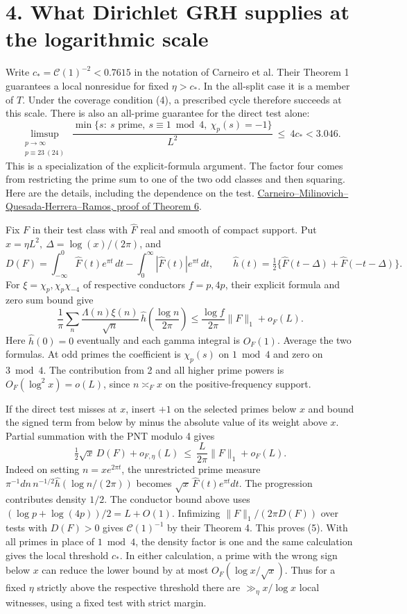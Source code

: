 \documentclass[11pt]{article}
\newcommand{\ch}{\chi_p}
\newcommand{\cmqr}{\href{https://arxiv.org/pdf/2404.08380}{Carneiro--Milinovich--Quesada-Herrera--Ramos, proof of Theorem 6}}
\begin{document}
\newpage
\section*{4. What Dirichlet GRH supplies at the logarithmic scale}
Write \(c_*=\mathcal C(1)^{-2}<0.7615\) in the notation of Carneiro et
al. Their Theorem 1 guarantees a local nonresidue for fixed \(\eta>c_*\).
In the all-split case it is a member of \(T\). Under the coverage
condition (4), a prescribed cycle therefore succeeds at this scale.
There is also an all-prime guarantee for the direct test alone:
\begin{equation}
 \limsup_{\substack{p\to\infty\\p\equiv23\ (24)}}\
 \frac{\min\{s:\ s\text{ prime},\ s\equiv1\bmod4,\ \ch(s)=-1\}}{L^2}
 \ \le\ 4c_* <3.046.
\end{equation}
This is a specialization of the explicit-formula argument. The factor four
comes from restricting the prime sum to one of the two odd classes and then
squaring. Here are the details, including the dependence on the test.
\cmqr.

Fix \(F\) in their test class with \(\widehat F\) real and smooth of compact
support. Put \(x=\eta L^2,\ \Delta=\log(x)/(2\pi)\), and
\[
 D(F)=\int_{-\infty}^0\widehat F(t)e^{\pi t}\,dt
       -\int_0^\infty|\widehat F(t)|e^{\pi t}\,dt,\qquad
 \widehat h(t)=\tfrac12\{\widehat F(t-\Delta)+\widehat F(-t-\Delta)\}.
\]
For \(\xi=\ch,\ch\chi_{-4}\) of respective conductors \(f=p,4p\),
their explicit formula and zero sum bound give
\[
 \frac1\pi\sum_n\frac{\Lambda(n)\xi(n)}{\sqrt n}\,
       \widehat h\left(\frac{\log n}{2\pi}\right)
 \le\frac{\log f}{2\pi}\|F\|_1+o_F(L).
\]
Here \(\widehat h(0)=0\) eventually and each gamma integral is \(O_F(1)\).
Average the two formulas.
At odd primes the coefficient is \(\ch(s)\) on \(1\bmod4\) and zero on
\(3\bmod4\). The contribution from 2 and all higher prime powers is
\(O_F(\log^2 x)=o(L)\), since \(n\asymp_F x\) on the positive-frequency
support.

If the direct test misses at \(x\), insert \(+1\) on the selected primes
below \(x\) and bound the signed term from below by minus the absolute
value of its weight above \(x\). Partial summation with the PNT modulo 4
gives
\[
 \tfrac12\sqrt x\,D(F)+o_{F,\eta}(L)
 \ \le\ \frac{L}{2\pi}\|F\|_1+o_F(L).
\]
Indeed on setting \(n=xe^{2\pi t}\), the unrestricted prime measure
\(\pi^{-1}dn\,n^{-1/2}\widehat h(\log n/(2\pi))\) becomes
\(\sqrt x\,\widehat F(t)e^{\pi t}dt\). The progression contributes density
\(1/2\). The conductor bound above uses
\((\log p+\log(4p))/2=L+O(1)\). Infimizing
\(\|F\|_1/(2\pi D(F))\) over tests with \(D(F)>0\) gives
\(\mathcal C(1)^{-1}\) by their Theorem 4.
This proves (5). With all primes in place of \(1\bmod4\), the density factor
is one and the same calculation gives the local threshold \(c_*\).
In either calculation, a prime with the wrong sign below \(x\) can reduce
the lower bound by at most \(O_F(\log x/\sqrt x)\). Thus for a fixed
\(\eta\) strictly above the respective threshold there are
\(\gg_\eta x/\log x\) local witnesses, using a fixed test with strict margin.
\end{document}

